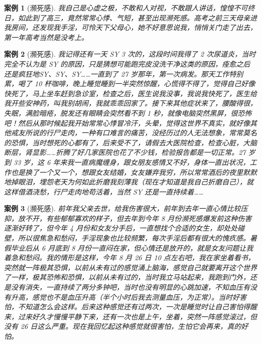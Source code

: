 \documentclass{ctexart}
\newtheorem{case}{案例}
\begin{document}
\begin{case}[濒死感]
    我自己是心虚之极，不敢和人对视，不敢跟人讲话，惶惶不可终日，如此到了高三，竟然常常心悸、气短，甚至出现濒死感。高考之前三天母亲进我房间，还发现我手淫，可怜天下父母心，她不好意思说我，悄悄关门走了出去，第一年高考当然是没考上。
\end{case}

\begin{case}[濒死感]
    我记得还有一天 SY 3 次的，这段时间我得了 2 次尿道炎，当时完全不认为是 SY 的原因，只是猜想可能跑完皮没洗干净这类的原因，痊愈之后还是疯狂地SY、SY、SY……一直到了 27 岁那年，第一次病发。那天工作特别累，喝了 10 杯咖啡，晚上睡觉睡到一半突然惊醒，心慌得不得了，觉得自己好像快死了，马上坐车赶到急诊室，检查之后，医生说我没事，我说我快死了，医生给我开些安神药，叫我别胡闹，我就乖乖回家了。接下来其他症状来了，腰酸得很，失眠，满脸暗疮，脱发还有眼睛会突然看不到 1 秒，就像电脑突然黑屏，很恐怖吧！然后从那时候起我开始常常心悸冒冷汗，头晕，觉得这世界不真实，就好像其他戒友所说的行尸走肉，一种有口难言的痛苦，没经历过的人无法想象，常常莫名的恐惧，当时想死的心都有了，后来受不了，请假去大医院检查，检查心脏，大脑断层，肾显影……折腾了好几家医院也花了不少钱，检验报告都是一切正常。27 岁到 33 岁，这 6 年来我一直病魔缠身，跟女朋友感情又不好，身体一直出状况，工作也是换了一个又一个，想跟女友结婚，女友嫌弃我穷，所以常常酒后的夜里默默地掉眼泪，埋怨老天为何如此折磨我刻薄我（现在才知道是我自己折磨自己），就这样借酒浇愁，行尸走肉地苟活着，当然 SY 还是一直持续着……
\end{case}

\begin{case}[濒死感]
    前年我父亲去世，给我伤害很大，前年到去年一直心情比较压抑，放不开，有些郁郁寡欢的样子，但去年到今年 8 月份濒死感爆发前这种伤害逐渐好转了，但今年 4 月份和女友分手后，一直想找个合适的女生，却处处碰壁，所以很焦急和愁闷，手淫现象也比较频繁，每次手淫后都有很大的愧疚感。暑假毕业后从 6 月底到 8 月份一直闷在家，但心情还是放开的，就是女友问题让我着急和愁闷。我的情形是这样，今年 8 月 26 日 10 点左右吧，我在家坐着看书，突然就一阵极其恐惧，以前从未有过的感觉涌上脑海，感觉自己就要离开这个世界了一样，极其恐怖和恐惧，以前从未有过的，当时我立马站起来，我跑到门外，还是没有消失，一直持续了两分多钟吧，当时也没有明显的心跳加速，不知血压有没有升高，感觉也不是血压升高（半个小时后我去测量血压，为正常）。当时好害怕，不知道怎么会这样。后来这种感觉还有过两次，一次是睡觉时让自己害怕得醒来，过来好久才慢慢平静下来，还有一次也是上午，坐着，突然一阵感觉滚过，但没有 26 日这么严重。现在我回忆起这种感觉就很害怕，生怕它会再来，真的好怕。
\end{case}
\end{document}
